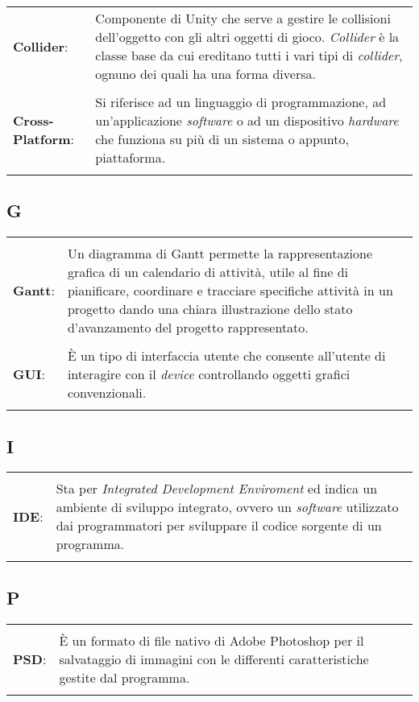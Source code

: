{{{\begin{longtable}{p{} p{}}
		\\
		\textbf{Collider}:		&	 Componente di Unity che serve a gestire le collisioni dell'oggetto con gli altri oggetti di gioco. \textit{Collider} è la classe base da cui ereditano tutti i vari tipi di \textit{collider}, ognuno dei quali ha una forma diversa.\\
		
		\\
		\textbf{Cross-Platform}:		&	 Si riferisce ad un linguaggio di programmazione, ad un'applicazione \textit{software} o ad un dispositivo \textit{hardware} che funziona su più di un sistema o appunto, piattaforma.\\
	\end{longtable}
	
	\subsection{G}{
		\normalsize
		\begin{longtable}{p{} p{}} 
			\\
			\textbf{Gantt}:		&	 Un diagramma di Gantt permette la rappresentazione grafica di un calendario di attività, utile al fine di pianificare, coordinare e tracciare specifiche attività in un progetto dando una chiara illustrazione dello stato d'avanzamento del progetto rappresentato.\\
			\\
			\textbf{GUI}:		&	 \`E un tipo di interfaccia utente che consente all'utente di interagire con il \textit{device} controllando oggetti grafici convenzionali.\\
		\end{longtable}
		
	\subsection{I}{
		\normalsize
		\begin{longtable}{p{} p{}} 
			\\
			\textbf{IDE}:		&	 Sta per \textit{Integrated Development Enviroment} ed indica un ambiente di sviluppo integrato, ovvero un \textit{software} utilizzato dai programmatori per sviluppare il codice sorgente di un programma.\\
		\end{longtable}

	\subsection{P}{
		\normalsize
		\begin{longtable}{p{} p{}} 
			\\
			\textbf{PSD}:		&	 \`E un formato di file nativo di Adobe Photoshop per il salvataggio di immagini con le differenti caratteristiche gestite dal programma. \\
		\end{longtable}

}}}}}}
